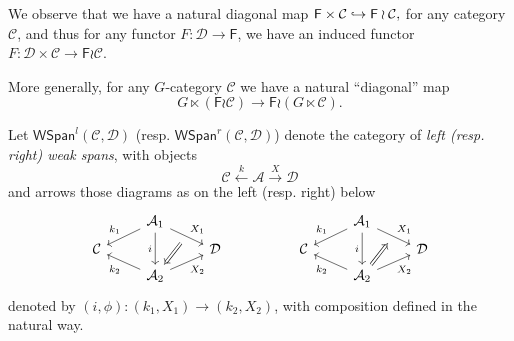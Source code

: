 \documentclass[a4paper,10pt
,draft
]{article}%
\renewcommand{\1}{\eta}%
\begin{document}
\begin{remark}
      \label{WR_DIAG_REM}
      We observe that we have a natural diagonal map
      $
      \mathsf F \times \mathcal C \hookrightarrow \mathsf F \wr \mathcal C,
      $
      for any category $\mathcal C$,
      and thus for any functor $F: \mathcal D \to \mathsf F$, we have an induced functor
      $F: \mathcal D \times \mathcal C \to \mathsf F \wr \mathcal C$.

      More generally, for any $G$-category $\mathcal C$ we have a natural ``diagonal'' map
      \begin{equation} 
            G \ltimes (\mathsf F \wr \mathcal C) \to \mathsf F \wr (G \ltimes \mathcal C).
      \end{equation}
\end{remark}

\begin{definition}
      Let $\mathsf{WSpan}^l(\mathcal C, \mathcal D)$ (resp. $\mathsf{WSpan}^r(\mathcal C, \mathcal D)$)
      denote the category of \textit{left (resp. right) weak spans}, with objects
      \begin{equation}
            \mathcal C \xleftarrow{k} \mathcal A \xrightarrow{X} \mathcal D
      \end{equation}
      and arrows those diagrams as on the left (resp. right) below
      \begin{equation}
            \begin{tikzcd}[row sep = tiny]
                  & \mathcal A_1 \arrow[dr, "X_1", ""'{name=U}] \arrow[dl, "k_1"'] \arrow[dd, "i"']
                  &
                  &&
                  &
                  \mathcal A_1 \arrow[dr, "X_1", ""'{name=A}] \arrow[dl, "k_1"'] \arrow[dd, "i"']
                  \\
                  \mathcal C
                  &&
                  \mathcal D
                  &&
                  \mathcal C
                  &&
                  \mathcal D
                  \\
                  & |[alias=V]| \mathcal A_2 \arrow[ur, "X_2"'] \arrow[ul, "k_2"]
                  &
                  &&
                  &
                  |[alias=B]| \mathcal A_2 \arrow[ur, "X_2"'] \arrow[ul, "k_2"]
                  \arrow[Rightarrow, from = U, to = V]
                  \arrow[Rightarrow, from = B, to = A]
            \end{tikzcd}
      \end{equation}
      denoted by $(i,\phi): (k_1,X_1) \to (k_2,X_2)$, with composition defined in the natural way.      
\end{definition}
\end{document}
